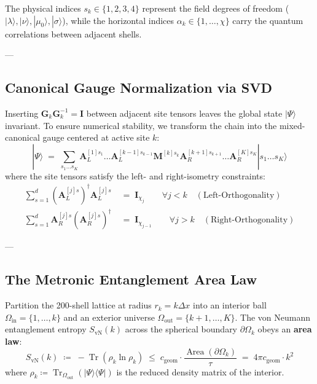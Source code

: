 \documentclass[
    12pt,
    a4paper,
    headings=normal,
    twoside=false,
    open=any,
    parskip=half
]{scrbook}
\begin{document}
The physical indices $s_k \in \{1, 2, 3, 4\}$ represent the field degrees of freedom ($|\lambda\rangle, |\nu\rangle, |\mu_0\rangle, |\sigma\rangle$), while the horizontal indices $\alpha_k \in \{1, \dots, \chi\}$ carry the quantum correlations between adjacent shells.

---

\subsection{Canonical Gauge Normalization via SVD}

Inserting $\mathbf{G}_k \mathbf{G}_k^{-1} = \mathbf{I}$ between adjacent site tensors leaves the global state $|\Psi\rangle$ invariant. To ensure numerical stability, we transform the chain into the mixed-canonical gauge centered at active site $k$:
\begin{equation}
|\Psi\rangle \;=\; \sum_{s_1 \dots s_K} \mathbf{A}_L^{[1]s_1} \dots \mathbf{A}_L^{[k-1]s_{k-1}} \mathbf{M}^{[k]s_k} \mathbf{A}_R^{[k+1]s_{k+1}} \dots \mathbf{A}_R^{[K]s_K} |s_1 \dots s_K\rangle
\label{eq:ch4_mixed_canonical_mps}
\end{equation}
where the site tensors satisfy the left- and right-isometry constraints:
\begin{align}
\sum_{s=1}^d \left( \mathbf{A}_L^{[j]s} \right)^\dagger \mathbf{A}_L^{[j]s} &\;=\; \mathbf{I}_{\chi_j} \qquad \forall j < k \quad (\text{Left-Orthogonality}) \label{eq:ch4_left_ortho} \\
\sum_{s=1}^d \mathbf{A}_R^{[j]s} \left( \mathbf{A}_R^{[j]s} \right)^\dagger &\;=\; \mathbf{I}_{\chi_{j-1}} \qquad \forall j > k \quad (\text{Right-Orthogonality}) \label{eq:ch4_right_ortho}
\end{align}

---

\subsection{The Metronic Entanglement Area Law}

\begin{phystheorem}\label{thm:ch4_entanglement_area_law}
Partition the 200-shell lattice at radius $r_k = k \Delta x$ into an interior ball $\Omega_{\text{in}} = \{1, \dots, k\}$ and an exterior universe $\Omega_{\text{out}} = \{k+1, \dots, K\}$. The von Neumann entanglement entropy $S_{\text{vN}}(k)$ across the spherical boundary $\partial\Omega_k$ obeys an \textbf{area law}:
\begin{equation}
\boxed{S_{\text{vN}}(k) \;\coloneqq\; -\operatorname{Tr}\left( \rho_k \ln \rho_k \right) \;\le\; c_{\text{geom}} \cdot \frac{\operatorname{Area}(\partial\Omega_k)}{\tau} \;=\; 4\pi c_{\text{geom}} \cdot k^2}
\label{eq:ch4_area_law_master}
\end{equation}
where $\rho_k \coloneqq \operatorname{Tr}_{\Omega_{\text{out}}}(|\Psi\rangle\langle\Psi|)$ is the reduced density matrix of the interior.
\end{phystheorem}
\end{document}
